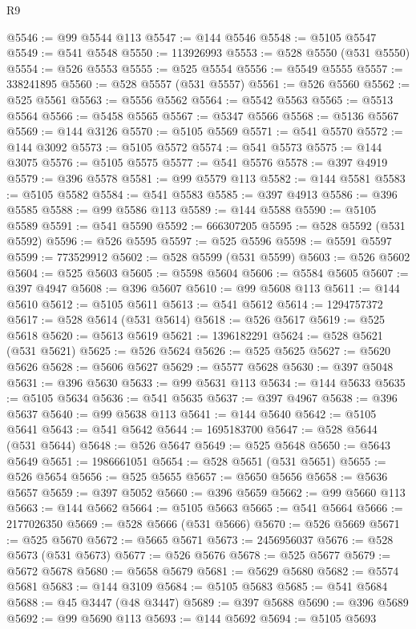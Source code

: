 \begin{lexlean}{R9}
\begin{coremodule}
{{{{{{{{{{{{{{{{{{{{{{{{{{{{{{{{{{{{{{{{{{{{{{{{{{{{{{{{{{{{{{{{{{{{{{{{{{{{{{{{{{{{@5546 := @99 @5544 @113
@5547 := @144 @5546
@5548 := @5105 @5547
@5549 := @541 @5548
@5550 := 113926993
@5553 := @528 @5550 (@531 @5550)
@5554 := @526 @5553
@5555 := @525 @5554
@5556 := @5549 @5555
@5557 := 338241895
@5560 := @528 @5557 (@531 @5557)
@5561 := @526 @5560
@5562 := @525 @5561
@5563 := @5556 @5562
@5564 := @5542 @5563
@5565 := @5513 @5564
@5566 := @5458 @5565
@5567 := @5347 @5566
@5568 := @5136 @5567
@5569 := @144 @3126
@5570 := @5105 @5569
@5571 := @541 @5570
@5572 := @144 @3092
@5573 := @5105 @5572
@5574 := @541 @5573
@5575 := @144 @3075
@5576 := @5105 @5575
@5577 := @541 @5576
@5578 := @397 @4919
@5579 := @396 @5578
@5581 := @99 @5579 @113
@5582 := @144 @5581
@5583 := @5105 @5582
@5584 := @541 @5583
@5585 := @397 @4913
@5586 := @396 @5585
@5588 := @99 @5586 @113
@5589 := @144 @5588
@5590 := @5105 @5589
@5591 := @541 @5590
@5592 := 666307205
@5595 := @528 @5592 (@531 @5592)
@5596 := @526 @5595
@5597 := @525 @5596
@5598 := @5591 @5597
@5599 := 773529912
@5602 := @528 @5599 (@531 @5599)
@5603 := @526 @5602
@5604 := @525 @5603
@5605 := @5598 @5604
@5606 := @5584 @5605
@5607 := @397 @4947
@5608 := @396 @5607
@5610 := @99 @5608 @113
@5611 := @144 @5610
@5612 := @5105 @5611
@5613 := @541 @5612
@5614 := 1294757372
@5617 := @528 @5614 (@531 @5614)
@5618 := @526 @5617
@5619 := @525 @5618
@5620 := @5613 @5619
@5621 := 1396182291
@5624 := @528 @5621 (@531 @5621)
@5625 := @526 @5624
@5626 := @525 @5625
@5627 := @5620 @5626
@5628 := @5606 @5627
@5629 := @5577 @5628
@5630 := @397 @5048
@5631 := @396 @5630
@5633 := @99 @5631 @113
@5634 := @144 @5633
@5635 := @5105 @5634
@5636 := @541 @5635
@5637 := @397 @4967
@5638 := @396 @5637
@5640 := @99 @5638 @113
@5641 := @144 @5640
@5642 := @5105 @5641
@5643 := @541 @5642
@5644 := 1695183700
@5647 := @528 @5644 (@531 @5644)
@5648 := @526 @5647
@5649 := @525 @5648
@5650 := @5643 @5649
@5651 := 1986661051
@5654 := @528 @5651 (@531 @5651)
@5655 := @526 @5654
@5656 := @525 @5655
@5657 := @5650 @5656
@5658 := @5636 @5657
@5659 := @397 @5052
@5660 := @396 @5659
@5662 := @99 @5660 @113
@5663 := @144 @5662
@5664 := @5105 @5663
@5665 := @541 @5664
@5666 := 2177026350
@5669 := @528 @5666 (@531 @5666)
@5670 := @526 @5669
@5671 := @525 @5670
@5672 := @5665 @5671
@5673 := 2456956037
@5676 := @528 @5673 (@531 @5673)
@5677 := @526 @5676
@5678 := @525 @5677
@5679 := @5672 @5678
@5680 := @5658 @5679
@5681 := @5629 @5680
@5682 := @5574 @5681
@5683 := @144 @3109
@5684 := @5105 @5683
@5685 := @541 @5684
@5688 := @45 @3447 (@48 @3447)
@5689 := @397 @5688
@5690 := @396 @5689
@5692 := @99 @5690 @113
@5693 := @144 @5692
@5694 := @5105 @5693
}}}}}}}}}}}}}}}}}}}}}}}}}}}}}}}}}}}}}}}}}}}}}}}}}}}}}}}}}}}}}}}}}}}}}}}}}}}}}}}}}}}}
\end{coremodule}
\end{lexlean}
